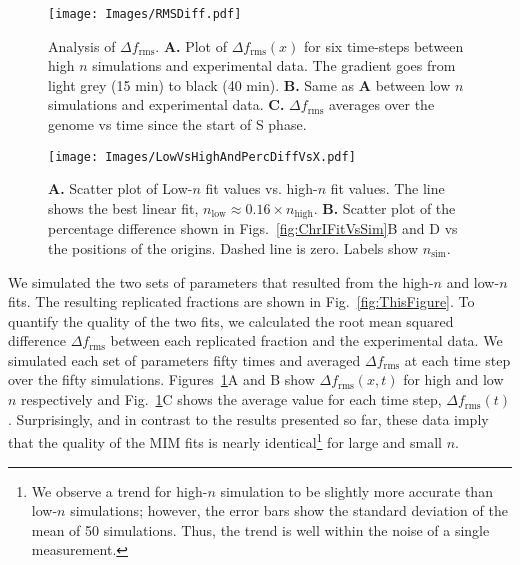 	\begin{figure}[tbh]
		\begin{center}
			\texttt{[image: Images/RMSDiff.pdf]}
		\end{center}
			\caption[Root Mean Square Difference Between Simulations and Experimental Data]{\label{fig:RMSDiff} 
				Analysis of $\Delta f_\text{rms}$.
				\textbf{A.} Plot of $\Delta f_\text{rms}(x)$ for six time-steps between high $n$ simulations and experimental data.
				The gradient goes from light grey (15 min) to black (40 min).
				\textbf{B.} Same as \textbf{A} between low $n$ simulations and experimental data.
				\textbf{C.} $\Delta f_\text{rms}$ averages over the genome vs time since the start of S phase.
			}
	\end{figure} 
		
	\begin{figure}[tbh!]
		\begin{center}
			\texttt{[image: Images/LowVsHighAndPercDiffVsX.pdf]}
		\end{center}
			\caption[Low-$n$ Fit Values vs. High-$n$ Fit Values and Percentage Difference Over the Genome]{\label{fig:ChrISims}
				\textbf{A.} Scatter plot of Low-$n$ fit values vs. high-$n$ fit values.
				The line shows the best linear fit, $n_\text{low} \approx 0.16\times n_\text{high}$.
				\textbf{B.} Scatter plot of the percentage difference shown in Figs.~\ref{fig:ChrIFitVsSim}B and D vs the positions of the origins.
				Dashed line is zero.
				Labels show $n_\text{sim}$.
			}
	\end{figure} 
	
	We simulated the two sets of parameters that resulted from the high-$n$ and low-$n$ fits.
	The resulting replicated fractions are shown in Fig.~\ref{fig:ThisFigure}.
	To quantify the quality of the two fits, we calculated the root mean squared difference $\Delta f_\text{rms}$ between each replicated fraction and the experimental data.
	We simulated each set of parameters fifty times and averaged $\Delta f_\text{rms}$ at each time step over the fifty simulations.
	Figures~\ref{fig:RMSDiff}A and B show $\Delta f_\text{rms}(x,t)$ for high and low $n$ respectively and Fig.~\ref{fig:RMSDiff}C shows the average value for each time step, $\Delta f_\text{rms}(t)$.
	Surprisingly, and in contrast to the results presented so far, these data imply that the quality of the MIM fits is nearly identical\footnote{
	We observe a trend for high-$n$ simulation to be slightly more accurate than low-$n$ simulations; however, the error bars show the standard deviation of the mean of 50 simulations. Thus, the trend is well within the noise of a single measurement.}
	for large and small $n$.
		
